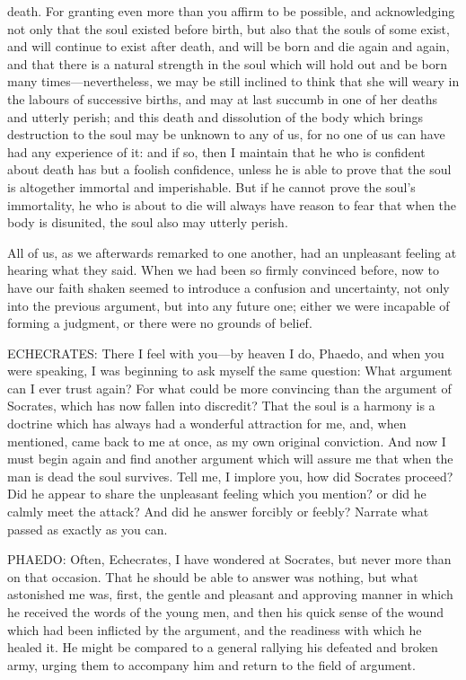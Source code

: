death. For granting even more than you affirm to be possible, and
acknowledging not only that the soul existed before birth, but also that
the souls of some exist, and will continue to exist after death, and will
be born and die again and again, and that there is a natural strength in
the soul which will hold out and be born many times—nevertheless, we
may be still inclined to think that she will weary in the labours of
successive births, and may at last succumb in one of her deaths and
utterly perish; and this death and dissolution of the body which brings
destruction to the soul may be unknown to any of us, for no one of us can
have had any experience of it: and if so, then I maintain that he who is
confident about death has but a foolish confidence, unless he is able to
prove that the soul is altogether immortal and imperishable. But if he
cannot prove the soul's immortality, he who is about to die will always
have reason to fear that when the body is disunited, the soul also may
utterly perish.

All of us, as we afterwards remarked to one another, had an unpleasant
feeling at hearing what they said. When we had been so firmly convinced
before, now to have our faith shaken seemed to introduce a confusion and
uncertainty, not only into the previous argument, but into any future one;
either we were incapable of forming a judgment, or there were no grounds
of belief.

ECHECRATES: There I feel with you—by heaven I do, Phaedo, and when
you were speaking, I was beginning to ask myself the same question: What
argument can I ever trust again? For what could be more convincing than
the argument of Socrates, which has now fallen into discredit? That the
soul is a harmony is a doctrine which has always had a wonderful
attraction for me, and, when mentioned, came back to me at once, as my own
original conviction. And now I must begin again and find another argument
which will assure me that when the man is dead the soul survives. Tell me,
I implore you, how did Socrates proceed? Did he appear to share the
unpleasant feeling which you mention? or did he calmly meet the attack?
And did he answer forcibly or feebly? Narrate what passed as exactly as
you can.

PHAEDO: Often, Echecrates, I have wondered at Socrates, but never more
than on that occasion. That he should be able to answer was nothing, but
what astonished me was, first, the gentle and pleasant and approving
manner in which he received the words of the young men, and then his quick
sense of the wound which had been inflicted by the argument, and the
readiness with which he healed it. He might be compared to a general
rallying his defeated and broken army, urging them to accompany him and
return to the field of argument.

